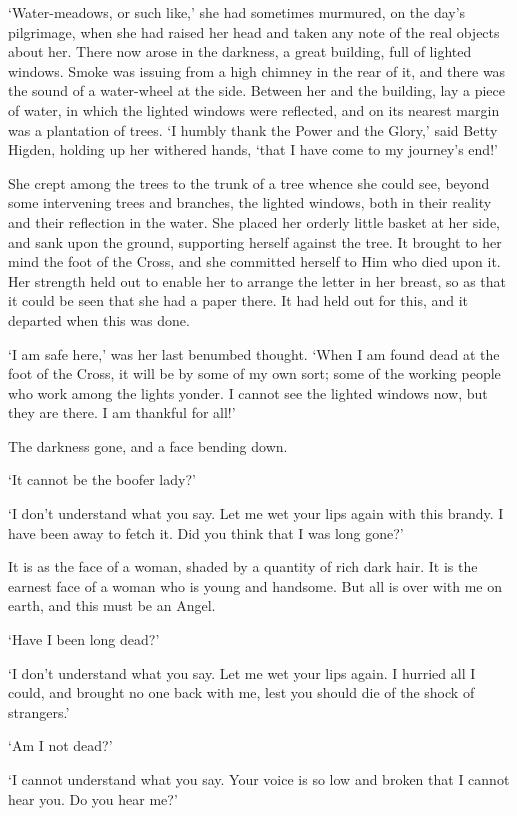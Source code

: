 ‘Water-meadows, or such like,’ she had sometimes murmured, on the day’s
pilgrimage, when she had raised her head and taken any note of the real
objects about her. There now arose in the darkness, a great building,
full of lighted windows. Smoke was issuing from a high chimney in
the rear of it, and there was the sound of a water-wheel at the side.
Between her and the building, lay a piece of water, in which the lighted
windows were reflected, and on its nearest margin was a plantation of
trees. ‘I humbly thank the Power and the Glory,’ said Betty Higden,
holding up her withered hands, ‘that I have come to my journey’s end!’

She crept among the trees to the trunk of a tree whence she could see,
beyond some intervening trees and branches, the lighted windows, both in
their reality and their reflection in the water. She placed her orderly
little basket at her side, and sank upon the ground, supporting herself
against the tree. It brought to her mind the foot of the Cross, and
she committed herself to Him who died upon it. Her strength held out to
enable her to arrange the letter in her breast, so as that it could
be seen that she had a paper there. It had held out for this, and it
departed when this was done.

‘I am safe here,’ was her last benumbed thought. ‘When I am found dead
at the foot of the Cross, it will be by some of my own sort; some of
the working people who work among the lights yonder. I cannot see the
lighted windows now, but they are there. I am thankful for all!’


The darkness gone, and a face bending down.

‘It cannot be the boofer lady?’

‘I don’t understand what you say. Let me wet your lips again with this
brandy. I have been away to fetch it. Did you think that I was long
gone?’

It is as the face of a woman, shaded by a quantity of rich dark hair.
It is the earnest face of a woman who is young and handsome. But all is
over with me on earth, and this must be an Angel.

‘Have I been long dead?’

‘I don’t understand what you say. Let me wet your lips again. I hurried
all I could, and brought no one back with me, lest you should die of the
shock of strangers.’

‘Am I not dead?’

‘I cannot understand what you say. Your voice is so low and broken that
I cannot hear you. Do you hear me?’

